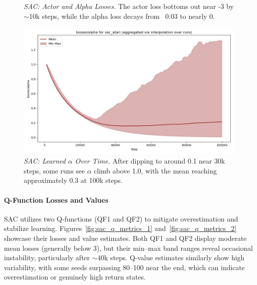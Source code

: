 \begin{figure}
	\centering
	\quad
	\caption{\emph{SAC: Actor and Alpha Losses.} The actor loss bottoms out near -3 by $\sim$\num{10}k steps, while the alpha loss decays from ~0.03 to nearly 0.}
	\label{fig:sac_actor_alpha_losses}
\end{figure}

\begin{figure}
	\centering
	\includegraphics[width=.5\textwidth]{figures/sac/losses_alpha_sac_atari.png}
	\caption{\emph{SAC: Learned $\alpha$ Over Time.} After dipping to around 0.1 near 30k steps, some runs see $\alpha$ climb above 1.0, with the mean reaching approximately 0.3 at 100k steps.}
	\label{fig:sac_alpha}
\end{figure}

\paragraph{Q-Function Losses and Values}
SAC utilizes two Q-functions (QF1 and QF2) to mitigate overestimation and stabilize learning. Figures~\ref{fig:sac_q_metrics_1} and~\ref{fig:sac_q_metrics_2} showcase their losses and value estimates. Both QF1 and QF2 display moderate mean losses (generally below 3), but their min–max band ranges reveal occasional instability, particularly after $\sim$40k steps. Q-value estimates similarly show high variability, with some seeds surpassing 80–100 near the end, which can indicate overestimation or genuinely high return states.

